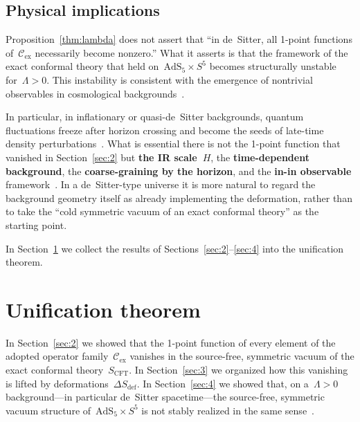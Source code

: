 \documentclass[
  aps,
  prd,
  preprint,
  groupedaddress,
  nofootinbib,
  longbibliography
]{revtex4-2}
\theoremstyle{remark}
\newcommand{\Cex}{\mathcal{C}_{\mathrm{ex}}}
\newcommand{\AdS}{\mathrm{AdS}}
\begin{document}
\subsection{Physical implications}\label{subsec:4-8}

Proposition~\ref{thm:lambda} does not assert that ``in de~Sitter,
all 1-point functions of~$\Cex$ necessarily become nonzero.''
What it asserts is that the framework of the exact conformal
theory that held on~$\AdS_5\times S^5$ becomes structurally
unstable for~$\Lambda>0$.
This instability is consistent with the emergence of nontrivial
observables in cosmological
backgrounds~\cite{ref15,ref16,ref17,ref18,ref19,ref20,ref21,
  ref22,ref23,ref24,ref25,ref26,ref27}.

In particular, in inflationary or quasi-de~Sitter backgrounds,
quantum fluctuations freeze after horizon crossing and become
the seeds of late-time density
perturbations~\cite{ref24,ref25}.
What is essential there is not the 1-point function that vanished
in Section~\ref{sec:2} but \textbf{the IR scale~$H$}, the
\textbf{time-dependent background}, the \textbf{coarse-graining
by the horizon}, and the \textbf{in-in observable}
framework~\cite{ref15,ref16,ref17,ref18,ref19,ref20,ref21,
  ref22,ref23,ref24,ref25,ref26,ref27}.
In a de~Sitter-type universe it is more natural to regard the
background geometry itself as already implementing the deformation,
rather than to take the ``cold symmetric vacuum of an exact
conformal theory'' as the starting point.

In Section~\ref{sec:5} we collect the results of
Sections~\ref{sec:2}--\ref{sec:4} into the unification theorem.

\section{Unification theorem}\label{sec:5}

In Section~\ref{sec:2} we showed that the 1-point function of
every element of the adopted operator family~$\Cex$ vanishes in
the source-free, symmetric vacuum of the exact conformal
theory~$S_{\mathrm{CFT}}$.
In Section~\ref{sec:3} we organized how
this vanishing is lifted by deformations~$\Delta S_{\mathrm{def}}$.
In Section~\ref{sec:4} we showed that, on a~$\Lambda>0$
background---in particular de~Sitter spacetime---the source-free,
symmetric vacuum structure of~$\AdS_5\times S^5$ is not stably
realized in the same
sense~\cite{ref1,ref2,ref3,ref4,ref5,ref6,ref7,ref8,ref9,ref10,
  ref11,ref12,ref13,ref14,ref15,ref16,ref17,ref18,ref19,ref20,
  ref21,ref22,ref23,ref24,ref25,ref26,ref27}.
\end{document}
